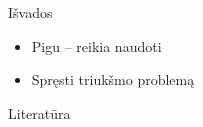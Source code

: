 \documentclass{beamer}
\begin{document}
    \begin{frame}{Išvados}
        \begin{itemize}
            \item Pigu -- reikia naudoti
            \item Spręsti triukšmo problemą
        \end{itemize}
    \end{frame}

    \begin{frame}[allowframebreaks]{Literatūra}
        
        

    \end{frame}
\end{document}
